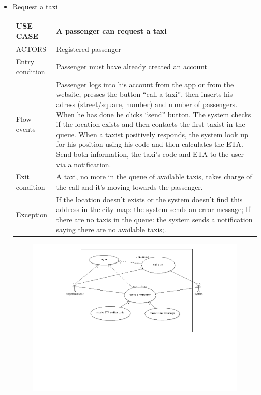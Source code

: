 \begin{itemize}
\begin{center}
\begin{figure} [h]
	\end{figure}
	\end{center}
	\newpage 
\item Request a taxi
	\begin{center}
   	 \begin{tabular}{ | l | p{11cm} |}
   	 \hline
   	USE CASE & A passenger can request a taxi\\ \hline
   	 ACTORS & Registered passenger \\ \hline
    	 Entry condition & Passenger must have already created an account \\ \hline
    	 Flow events & Passenger logs into his account from the app or from the website, presses the button “call a taxi”, then inserts 			his adress (street/square, number) and number of passengers. When he has done he clicks “send” button. The system checks 			if the location exists and then contacts the first taxist in the queue.
	When a taxist positively responds, the system look up for his position using his code and then calculates the ETA. Send both 			information, the taxi’s code and ETA to the user via a notification. \\ \hline
  	   Exit condition & A taxi, no more in the queue of available taxis, takes charge of the call and it’s moving towards the 				passenger.\\ \hline
  	   Exception &  If the location doesn’t exists or the system doesn’t find this address in the city map: the system sends an error 			message;
	If there are no taxis in the queue: the system sends a notification saying there are no available taxis;.\\ \hline
    \end{tabular}
	\end{center}
	\begin{center}
	\begin{figure} [h]
    	\includegraphics [scale=0.5]{callataxi.png}

\end{figure}
\end{center}
\end{itemize}

